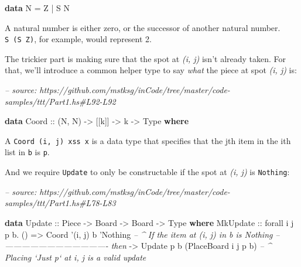 \documentclass[]{article}
\newenvironment{Shaded}{}{}
\newcommand{\CommentTok}[1]{\textcolor[rgb]{0.38,0.63,0.69}{\textit{#1}}}
\newcommand{\DataTypeTok}[1]{\textcolor[rgb]{0.56,0.13,0.00}{#1}}
\newcommand{\FunctionTok}[1]{\textcolor[rgb]{0.02,0.16,0.49}{#1}}
\newcommand{\KeywordTok}[1]{\textcolor[rgb]{0.00,0.44,0.13}{\textbf{#1}}}
\newcommand{\NormalTok}[1]{#1}
\newcommand{\OtherTok}[1]{\textcolor[rgb]{0.00,0.44,0.13}{#1}}
\begin{document}
\begin{Shaded}
\begin{Highlighting}[]
\KeywordTok{data} \DataTypeTok{N} \FunctionTok{=} \DataTypeTok{Z} \FunctionTok{|} \DataTypeTok{S} \DataTypeTok{N}
\end{Highlighting}
\end{Shaded}

A natural number is either zero, or the successor of another natural number.
\texttt{S\ (S\ Z)}, for example, would represent 2.

The trickier part is making sure that the spot at \emph{(i, j)} isn't already
taken. For that, we'll introduce a common helper type to say \emph{what} the
piece at spot \emph{(i, j)} is:

\begin{Shaded}
\begin{Highlighting}[]
\CommentTok{-- source: https://github.com/mstksg/inCode/tree/master/code-samples/ttt/Part1.hs#L92-L92}

\KeywordTok{data} \DataTypeTok{Coord}\OtherTok{ ::}\NormalTok{ (}\DataTypeTok{N}\NormalTok{, }\DataTypeTok{N}\NormalTok{) }\OtherTok{->}\NormalTok{ [[k]] }\OtherTok{->}\NormalTok{ k }\OtherTok{->} \DataTypeTok{Type} \KeywordTok{where}
\end{Highlighting}
\end{Shaded}

A \texttt{Coord\ \textquotesingle{}(i,\ j)\ xss\ x} is a data type that
specifies that the jth item in the ith list in \texttt{b} is \texttt{p}.

And we require \texttt{Update} to only be constructable if the spot at \emph{(i,
j)} is \texttt{Nothing}:

\begin{Shaded}
\begin{Highlighting}[]
\CommentTok{-- source: https://github.com/mstksg/inCode/tree/master/code-samples/ttt/Part1.hs#L78-L83}

\KeywordTok{data} \DataTypeTok{Update}\OtherTok{ ::} \DataTypeTok{Piece} \OtherTok{->} \DataTypeTok{Board} \OtherTok{->} \DataTypeTok{Board} \OtherTok{->} \DataTypeTok{Type} \KeywordTok{where}
    \DataTypeTok{MkUpdate}
\OtherTok{        ::}\NormalTok{ forall i j p b}\FunctionTok{.}\NormalTok{ ()}
        \OtherTok{=>} \DataTypeTok{Coord}\NormalTok{ '(i, j) b '}\DataTypeTok{Nothing}         \CommentTok{-- ^ If the item at (i, j) in b is Nothing}
        \CommentTok{-- ------------------------------------- then}
        \OtherTok{->} \DataTypeTok{Update}\NormalTok{ p b (}\DataTypeTok{PlaceBoard}\NormalTok{ i j p b)  }\CommentTok{-- ^ Placing `Just p` at i, j is a valid update}
\end{Highlighting}
\end{Shaded}
\end{document}
